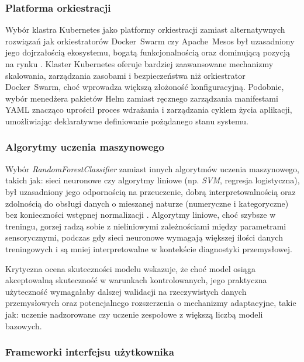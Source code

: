 {\subsubsection{Platforma orkiestracji}

Wybór klastra Kubernetes jako platformy orkiestracji zamiast alternatywnych rozwiązań jak orkiestratorów \mbox{Docker Swarm} czy \mbox{Apache Mesos} był uzasadniony jego dojrzałością ekosystemu, bogatą funkcjonalnością oraz dominującą pozycją na rynku \cite{kubernetes_benefits}. Klaster Kubernetes oferuje bardziej zaawansowane mechanizmy skalowania, zarządzania zasobami i bezpieczeństwa niż orkiestrator \mbox{Docker Swarm}, choć wprowadza większą złożoność konfiguracyjną. Podobnie, wybór menedżera pakietów \mbox{Helm} \cite{helm_docs} zamiast ręcznego zarządzania manifestami YAML \cite{yaml_spec} znacząco uprościł proces wdrażania i zarządzania cyklem życia aplikacji, umożliwiając deklaratywne definiowanie pożądanego stanu systemu.

\subsubsection{Algorytmy uczenia maszynowego}

Wybór \textit{\mbox{RandomForestClassifier}} zamiast innych algorytmów uczenia maszynowego, takich jak: sieci neuronowe czy algorytmy liniowe (np. \textit{\mbox{SVM}}, regresja logistyczna), był uzasadniony jego odpornością na przeuczenie, dobrą interpretowalnością oraz zdolnością do obsługi danych o mieszanej naturze (numeryczne i kategoryczne) bez konieczności wstępnej normalizacji \cite{spark_mllib_reference}. Algorytmy liniowe, choć szybsze w treningu, gorzej radzą sobie z nieliniowymi zależnościami między parametrami sensorycznymi, podczas gdy sieci neuronowe wymagają większej ilości danych treningowych i są mniej interpretowalne w kontekście diagnostyki przemysłowej.

Krytyczna ocena skuteczności modelu wskazuje, że choć model osiąga akceptowalną skuteczność w warunkach kontrolowanych, jego praktyczna użyteczność wymagałaby dalszej walidacji na rzeczywistych danych przemysłowych oraz potencjalnego rozszerzenia o mechanizmy adaptacyjne, takie jak: uczenie nadzorowane czy uczenie zespołowe z większą liczbą modeli bazowych.

\subsubsection{Frameworki interfejsu użytkownika}

}
